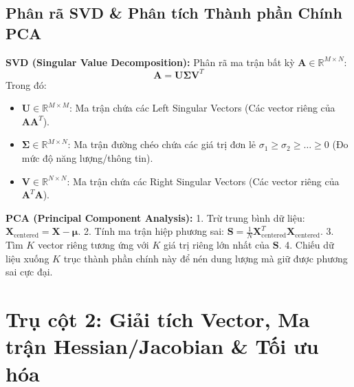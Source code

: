 \documentclass[11pt,a4paper]{article}
\begin{document}
\subsection{Phân rã SVD \& Phân tích Thành phần Chính PCA}
\textbf{SVD (Singular Value Decomposition):} Phân rã ma trận bất kỳ $\mathbf{A} \in \mathbb{R}^{M \times N}$:
$$\mathbf{A} = \mathbf{U} \mathbf{\Sigma} \mathbf{V}^T$$
Trong đó:
\begin{itemize}
    \item $\mathbf{U} \in \mathbb{R}^{M \times M}$: Ma trận chứa các Left Singular Vectors (Các vector riêng của $\mathbf{A} \mathbf{A}^T$).
    \item $\mathbf{\Sigma} \in \mathbb{R}^{M \times N}$: Ma trận đường chéo chứa các giá trị đơn lẻ $\sigma_1 \ge \sigma_2 \ge \dots \ge 0$ (Đo mức độ năng lượng/thông tin).
    \item $\mathbf{V} \in \mathbb{R}^{N \times N}$: Ma trận chứa các Right Singular Vectors (Các vector riêng của $\mathbf{A}^T \mathbf{A}$).
\end{itemize}

\textbf{PCA (Principal Component Analysis):}
1. Trừ trung bình dữ liệu: $\mathbf{X}_{\text{centered}} = \mathbf{X} - \boldsymbol{\mu}$.
2. Tính ma trận hiệp phương sai: $\mathbf{S} = \frac{1}{N} \mathbf{X}_{\text{centered}}^T \mathbf{X}_{\text{centered}}$.
3. Tìm $K$ vector riêng tương ứng với $K$ giá trị riêng lớn nhất của $\mathbf{S}$.
4. Chiếu dữ liệu xuống $K$ trục thành phần chính này để nén dung lượng mà giữ được phương sai cực đại.

\newpage
\section{Trụ cột 2: Giải tích Vector, Ma trận Hessian/Jacobian \& Tối ưu hóa}
\end{document}
